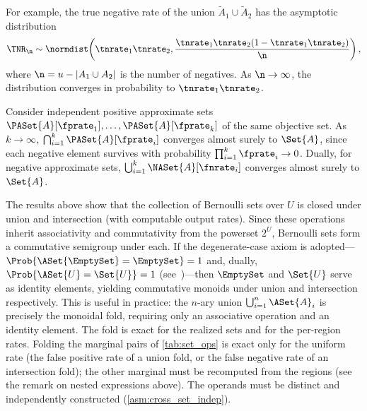 For example, the true negative rate of the union $\tilde{A}_1 \cup \tilde{A}_2$ has the asymptotic distribution
\begin{equation}
\TNR_\n \sim \normdist\!\left(\tnrate_1 \tnrate_2, \frac{\tnrate_1 \tnrate_2 (1-\tnrate_1 \tnrate_2)}{\n}\right),
\end{equation}
where $\n = u - |A_1 \cup A_2|$ is the number of negatives.
As $\n \to \infty$, the distribution converges in probability to $\tnrate_1 \tnrate_2$.

\begin{remark}
	Consider independent positive approximate sets
	$\PASet{A}[\fprate_1],\ldots,\PASet{A}[\fprate_k]$
	of the same objective set.
	As $k \to \infty$, $\bigcap_{i=1}^{k} \PASet{A}[\fprate_i]$ converges
	almost surely to $\Set{A}$, since each negative element survives with
	probability $\prod_{i=1}^{k} \fprate_i \to 0$.
	Dually, for negative approximate sets,
	$\bigcup_{i=1}^{k} \NASet{A}[\fnrate_i]$ converges almost surely
	to $\Set{A}$.
\end{remark}

\begin{remark}
\label{rem:monoid}
The results above show that the collection of Bernoulli sets over $U$ is
closed under union and intersection (with computable output rates).
Since these operations inherit associativity and commutativity from the
powerset $2^U$, Bernoulli sets form a commutative semigroup under each.
If the degenerate-case axiom is adopted---$\Prob{\ASet{\EmptySet} =
\EmptySet} = 1$ and, dually, $\Prob{\ASet{U} = \Set{U}} = 1$ (see~\cite{bernoulliSets})---then $\EmptySet$ and $\Set{U}$ serve as
identity elements, yielding commutative monoids under union and
intersection respectively.
This is useful in practice: the $n$-ary union
$\bigcup_{i=1}^{n} \ASet{A}_i$ is precisely the monoidal fold, requiring only an
associative operation and an identity element.
The fold is exact for the realized sets and for the per-region rates.
Folding the marginal pairs of \cref{tab:set_ops} is exact only for the uniform rate (the false positive rate of a union fold, or the false negative rate of an intersection fold); the other marginal must be recomputed from the regions (see the remark on nested expressions above).
The operands must be distinct and independently constructed (\cref{asm:cross_set_indep}).
\end{remark}
